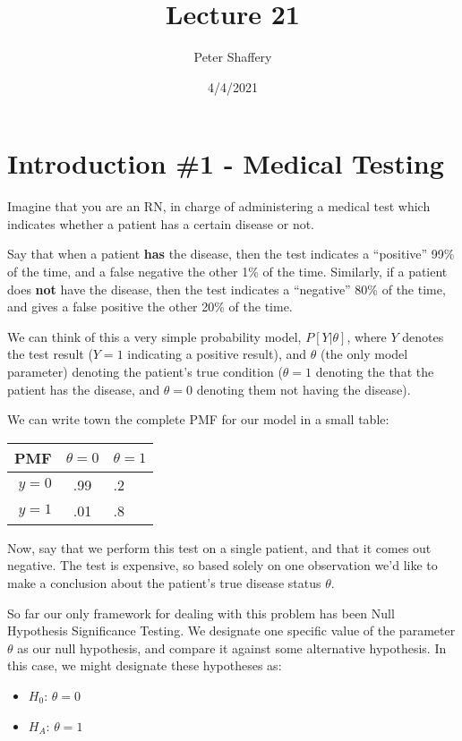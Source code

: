 \documentclass[
]{article}
\title{Lecture 21}
\author{Peter Shaffery}
\date{4/4/2021}
\providecommand{\tightlist}{%
  \setlength{\itemsep}{0pt}\setlength{\parskip}{0pt}}
\begin{document}
\maketitle

\hypertarget{introduction-1---medical-testing}{%
\section{Introduction \#1 - Medical
Testing}\label{introduction-1---medical-testing}}

Imagine that you are an RN, in charge of administering a medical test
which indicates whether a patient has a certain disease or not.

Say that when a patient \textbf{has} the disease, then the test
indicates a ``positive'' 99\% of the time, and a false negative the
other 1\% of the time. Similarly, if a patient does \textbf{not} have
the disease, then the test indicates a ``negative'' 80\% of the time,
and gives a false positive the other 20\% of the time.

We can think of this a very simple probability model, \(P[Y|\theta]\),
where \(Y\) denotes the test result (\(Y=1\) indicating a positive
result), and \(\theta\) (the only model parameter) denoting the
patient's true condition (\(\theta=1\) denoting the that the patient has
the disease, and \(\theta=0\) denoting them not having the disease).

We can write town the complete PMF for our model in a small table:

\begin{longtable}[]{@{}rcl@{}}
\toprule
PMF & \(\theta=0\) & \(\theta=1\) \\
\midrule
\endhead
\(y=0\) & .99 & .2 \\
\(y=1\) & .01 & .8 \\
\bottomrule
\end{longtable}

Now, say that we perform this test on a single patient, and that it
comes out negative. The test is expensive, so based solely on one
observation we'd like to make a conclusion about the patient's true
disease status \(\theta\).

So far our only framework for dealing with this problem has been Null
Hypothesis Significance Testing. We designate one specific value of the
parameter \(\theta\) as our null hypothesis, and compare it against some
alternative hypothesis. In this case, we might designate these
hypotheses as:

\begin{itemize}
\tightlist
\item
  \(H_0\): \(\theta=0\)
\item
  \(H_A\): \(\theta=1\)
\end{itemize}
\end{document}
